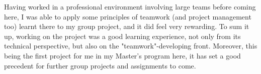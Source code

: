 \documentclass[]{report}
\begin{document}
Having worked in a professional environment involving large teams before coming here, I was able to apply some principles of teamwork (and project management too) learnt there to my group project, and it did feel very rewarding. To sum it up, working on the project was a good learning experience, not only from its technical perspective, but also on the "teamwork"-developing front. Moreover, this being the first project for me in my Master's program here, it has set a good precedent for further group projects and assignments to come. 

 
\end{document}
